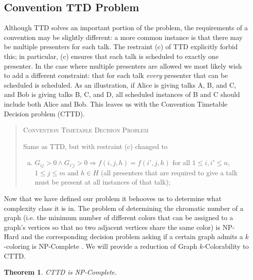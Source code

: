 \documentclass[]{article}
\newtheorem{thm}{Theorem}[section]
\theoremstyle{definition}
\theoremstyle{remark}
\numberwithin{equation}{section}
\begin{document}
\subsection{Convention TTD Problem}
Although TTD solves an important portion of the problem, the requirements of a convention may be slightly different: a more common instance is that there may be multiple presenters for each talk. The restraint (c) of TTD explicitly forbid this; in particular, (c) ensures that each talk is scheduled to exactly one presenter. In the case where multiple presenters are allowed we most likely wish to add a different constraint: that for each talk \emph{every} presenter that can be scheduled is scheduled. As an illustration, if Alice is giving talks A, B, and C, and Bob is giving talks B, C, and D, all scheduled instances of B and C should include both Alice and Bob. This leaves us with the Convention Timetable Decision problem (CTTD).
\begin{quote}
	\textsc{Convention Timetable Decision Problem}
	
	Same as TTD, but with restraint (c) changed to
	\begin{enumerate}[(c)]
		\item $G_{ij} > 0 \land G_{i'j} > 0 \Rightarrow f(i,j,h)=f(i',j,h)$ for all $1 \le i,i' \le n$, $1 \le j \le m$ and $h \in H$ (all presenters that are required to give a talk must be present at all instances of that talk);
	\end{enumerate}
\end{quote}
Now that we have defined our problem it behooves us to determine what complexity class it is in. The problem of determining the chromatic number of a graph (i.e. the minimum number of different colors that can be assigned to a graph's vertices so that no two adjacent vertices share the same color) is NP-Hard and the corresponding decision problem asking if a certain graph admits a $k$-coloring is NP-Complete \cite{garey76_2}. We will provide a reduction of Graph $k$-Colorability to CTTD.
\begin{thm}
CTTD is NP-Complete.
\end{thm}
\end{document}
